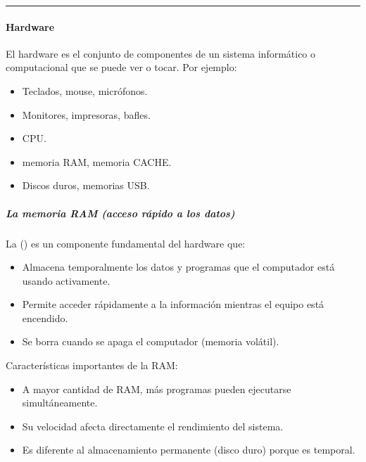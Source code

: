 \documentclass[letterpaper,10pt,spanish]{sphinxmanual}
\begin{document}
\bigskip\hrule\bigskip



\paragraph{Hardware}
\label{\detokenize{cursos/ofimatica11/recursos/T01:hardware}}
\sphinxAtStartPar
\sphinxfootnotemark[2] El hardware es el conjunto de componentes de un sistema informático o computacional que se puede ver o tocar. Por ejemplo:
\begin{itemize}
\item {} 
\sphinxAtStartPar
{} Teclados, mouse, micrófonos.

\item {} 
\sphinxAtStartPar
{} Monitores, impresoras, bafles.

\item {} 
\sphinxAtStartPar
{} CPU.

\item {} 
\sphinxAtStartPar
{} memoria RAM, memoria CACHE.

\item {} 
\sphinxAtStartPar
{} Discos duros, memorias USB.

\end{itemize}


\subparagraph{La memoria RAM (acceso rápido a los datos)}
\label{\detokenize{cursos/ofimatica11/recursos/T01:la-memoria-ram-acceso-rapido-a-los-datos}}
\sphinxAtStartPar
La  () es un componente fundamental del hardware que:
\begin{itemize}
\item {} 
\sphinxAtStartPar
Almacena temporalmente los datos y programas que el computador está usando activamente.

\item {} 
\sphinxAtStartPar
Permite acceder rápidamente a la información mientras el equipo está encendido.

\item {} 
\sphinxAtStartPar
Se borra cuando se apaga el computador (memoria volátil).

\end{itemize}

\sphinxAtStartPar
Características importantes de la RAM:
\begin{itemize}
\item {} 
\sphinxAtStartPar
A mayor cantidad de RAM, más programas pueden ejecutarse simultáneamente.

\item {} 
\sphinxAtStartPar
Su velocidad afecta directamente el rendimiento del sistema.

\item {} 
\sphinxAtStartPar
Es diferente al almacenamiento permanente (disco duro) porque es temporal.

\end{itemize}
\end{document}
